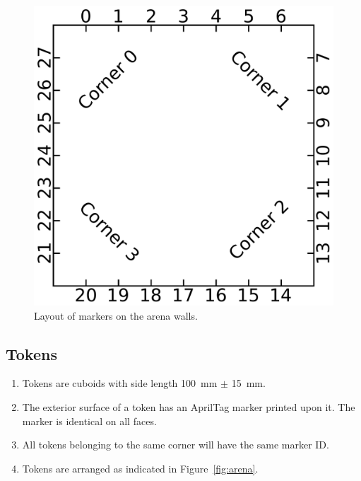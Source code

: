 \begin{figure}
  \centering
  \includegraphics[scale=0.5]{fig-markers.pdf}
  \caption{Layout of markers on the arena walls.}
  \label{fig:markers}
\end{figure}

\subsection{Tokens}
\label{spec:tokens}

\begin{enumerate}
  \item Tokens are cuboids with side length \SI{100}{mm} $\pm$ \SI{15}{mm}.
  \item The exterior surface of a token has an AprilTag marker printed upon it. The marker is identical on all faces.
  \item All tokens belonging to the same corner will have the same marker ID.
  \item Tokens are arranged as indicated in Figure~\ref{fig:arena}.
\end{enumerate}

